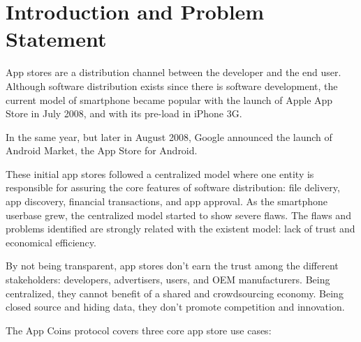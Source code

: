 
\section{Introduction and Problem Statement}
\label{sec: introduction}




App stores are a distribution channel between the developer and the end user. Although software distribution exists since there is software development, the current model of smartphone became popular with the launch of Apple App Store in July 2008, and with its pre-load in iPhone 3G.

In the same year, but later in August 2008, Google announced the launch of Android Market\cite{wiki:market}, the App Store for Android.

These initial app stores followed a centralized model where one entity is responsible for assuring the core features of software distribution: file delivery, app discovery, financial transactions, and app approval. As the smartphone userbase grew, the centralized model started to show severe flaws. The flaws and problems identified are strongly related with the existent model: lack of trust and economical efficiency. 

By not being transparent, app stores don't earn the trust among the different stakeholders: developers, advertisers, users, and OEM manufacturers. Being centralized, they cannot benefit of a shared and crowdsourcing economy. Being closed source and hiding data, they don't promote competition and innovation.


The App Coins protocol covers three core app store use cases:

